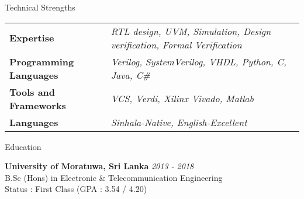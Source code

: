 \documentclass[
11pt, %
]{./assets/resume} %
\begin{document}
\begin{rSection}{Technical Strengths}
	
	\def\arraystretch{1.5}
	
	\begin{tabular}{p{2.0in} p{4.5in}}
		\textbf{Expertise} & \emph{RTL design, UVM, Simulation, Design verification, Formal Verification} \\
		\textbf{Programming Languages} & \emph{Verilog, SystemVerilog, VHDL, Python, C, Java, C\#} \\
		\textbf{Tools and Frameworks} & \emph{VCS, Verdi, Xilinx Vivado, Matlab} \\ 
		\textbf{Languages} & \emph{Sinhala-Native, English-Excellent} \\
	\end{tabular}
	
\end{rSection}


\begin{rSection}{Education}
	
	\textbf{University of Moratuwa, Sri Lanka} \hfill \textit{2013 - 2018} \\ 
	B.Sc (Hons) in Electronic \& Telecommunication Engineering \\
	Status : First Class (GPA : 3.54 / 4.20)
	
\end{rSection}

\end{document}
